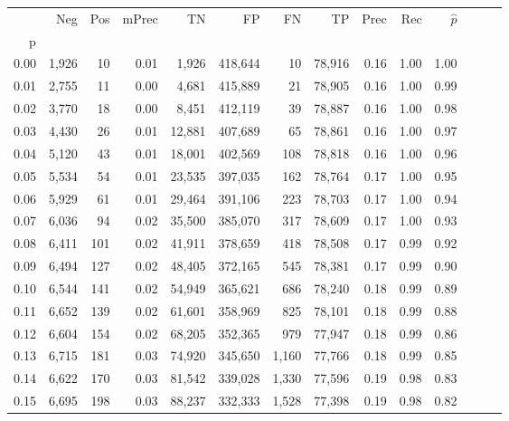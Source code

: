 \begin{tabular}{rrrrrrrrrrrrrr}
\toprule
{} &    Neg &    Pos & mPrec &       TN &       FP &      FN &      TP &  Prec &   Rec & $\hat{p}$ \\
p    &        &        &       &          &          &         &         &       &       &           \\
\midrule
0.00 &  1,926 &     10 &  0.01 &    1,926 &  418,644 &      10 &  78,916 &  0.16 &  1.00 &      1.00 \\
0.01 &  2,755 &     11 &  0.00 &    4,681 &  415,889 &      21 &  78,905 &  0.16 &  1.00 &      0.99 \\
0.02 &  3,770 &     18 &  0.00 &    8,451 &  412,119 &      39 &  78,887 &  0.16 &  1.00 &      0.98 \\
0.03 &  4,430 &     26 &  0.01 &   12,881 &  407,689 &      65 &  78,861 &  0.16 &  1.00 &      0.97 \\
0.04 &  5,120 &     43 &  0.01 &   18,001 &  402,569 &     108 &  78,818 &  0.16 &  1.00 &      0.96 \\
0.05 &  5,534 &     54 &  0.01 &   23,535 &  397,035 &     162 &  78,764 &  0.17 &  1.00 &      0.95 \\
0.06 &  5,929 &     61 &  0.01 &   29,464 &  391,106 &     223 &  78,703 &  0.17 &  1.00 &      0.94 \\
0.07 &  6,036 &     94 &  0.02 &   35,500 &  385,070 &     317 &  78,609 &  0.17 &  1.00 &      0.93 \\
0.08 &  6,411 &    101 &  0.02 &   41,911 &  378,659 &     418 &  78,508 &  0.17 &  0.99 &      0.92 \\
0.09 &  6,494 &    127 &  0.02 &   48,405 &  372,165 &     545 &  78,381 &  0.17 &  0.99 &      0.90 \\
0.10 &  6,544 &    141 &  0.02 &   54,949 &  365,621 &     686 &  78,240 &  0.18 &  0.99 &      0.89 \\
0.11 &  6,652 &    139 &  0.02 &   61,601 &  358,969 &     825 &  78,101 &  0.18 &  0.99 &      0.88 \\
0.12 &  6,604 &    154 &  0.02 &   68,205 &  352,365 &     979 &  77,947 &  0.18 &  0.99 &      0.86 \\
0.13 &  6,715 &    181 &  0.03 &   74,920 &  345,650 &   1,160 &  77,766 &  0.18 &  0.99 &      0.85 \\
0.14 &  6,622 &    170 &  0.03 &   81,542 &  339,028 &   1,330 &  77,596 &  0.19 &  0.98 &      0.83 \\
0.15 &  6,695 &    198 &  0.03 &   88,237 &  332,333 &   1,528 &  77,398 &  0.19 &  0.98 &      0.82 \\

\end{tabular}

